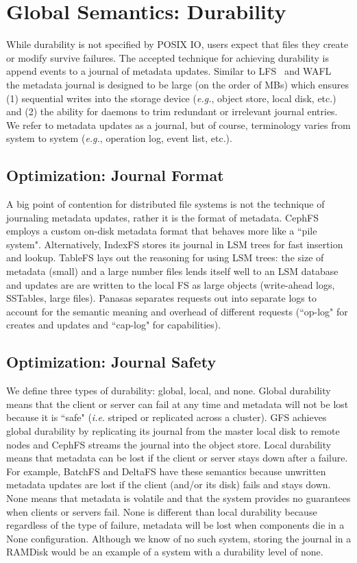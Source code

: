 \section{Global Semantics: Durability}

While durability is not specified by POSIX IO, users expect that files they
create or modify survive failures. The accepted technique for achieving
durability is append events to a journal of metadata updates.  Similar to
LFS~\cite{rosenblum:acm1992-LFS} and WAFL~\cite{hitz:wtec1994-WAFL} the
metadata journal is designed to be large (on the order of MBs) which ensures
(1) sequential writes into the storage device ({\it e.g.}, object store, local
disk, etc.) and (2) the ability for daemons to trim redundant or irrelevant
journal entries. We refer to metadata updates as a journal, but of course,
terminology varies from system to system ({\it e.g.}, operation log, event
list, etc.). 

\subsection{Optimization: Journal Format}

A big point of contention for distributed file systems is not the technique of
journaling metadata updates, rather it is the format of metadata. CephFS
employs a custom on-disk metadata format that behaves more like a ``pile
system". Alternatively, IndexFS stores its journal in LSM trees for fast
insertion and lookup. TableFS lays out the reasoning for using LSM trees: the
size of metadata (small) and a large number files lends itself well to an LSM
database and updates are are written to the local FS as large objects
(write-ahead logs, SSTables, large files). Panasas separates requests out into
separate logs to account for the semantic meaning and overhead of different
requests (``op-log" for creates and updates and ``cap-log" for capabilities).

\subsection{Optimization: Journal Safety}

We define three types of durability: global, local, and none.  Global
durability means that the client or server can fail at any time and metadata
will not be lost because it is ``safe" ({\it i.e.} striped or replicated across
a cluster). GFS achieves global durability by replicating its journal from the
master local disk to remote nodes and CephFS streams the journal into the
object store. Local durability means that metadata can be lost if the client or
server stays down after a failure. For example, BatchFS and DeltaFS have these
semantics because unwritten metadata updates are lost if the client (and/or its
disk) fails and stays down.  None means that metadata is volatile and that the
system provides no guarantees when clients or servers fail.  None is different
than local durability because regardless of the type of failure, metadata will
be lost when components die in a None configuration. Although we know of no
such system, storing the journal in a RAMDisk would be an example of a system
with a durability level of none.


